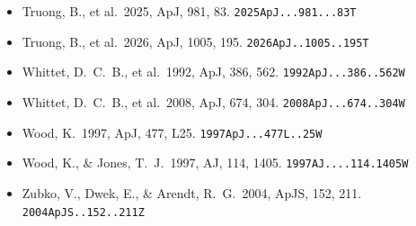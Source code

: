 \documentclass{my_memo}
\newcommand{\code}[1]{\texttt{#1}}
\begin{document}
\begin{itemize}
\item Truong, B., et al.\ 2025, ApJ, 981, 83.
      \code{2025ApJ...981...83T}

\item Truong, B., et al.\ 2026, ApJ, 1005, 195.
      \code{2026ApJ..1005..195T}

\item Whittet, D.~C.~B., et al.\ 1992, ApJ, 386, 562.
      \code{1992ApJ...386..562W}

\item Whittet, D.~C.~B., et al.\ 2008, ApJ, 674, 304.
      \code{2008ApJ...674..304W}

\item Wood, K.\ 1997, ApJ, 477, L25. \code{1997ApJ...477L..25W}

\item Wood, K., \& Jones, T.~J.\ 1997, AJ, 114, 1405.
      \code{1997AJ....114.1405W}

\item Zubko, V., Dwek, E., \& Arendt, R.~G.\ 2004, ApJS, 152, 211.
      \code{2004ApJS..152..211Z}

\end{itemize}
\end{document}
